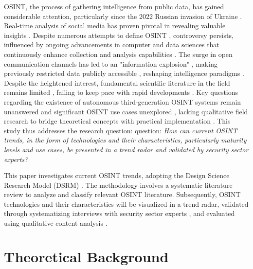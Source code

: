 \documentclass[10pt]{article}
\begin{document}
OSINT, the process of gathering intelligence from public data, has gained considerable attention, particularly since
the 2022 Russian invasion of Ukraine \cite{DosPassos.2017}. Real-time analysis of social media has proven pivotal in revealing
valuable insights \cite{SmithBoyle.24.07.2023}. Despite numerous attempts to define OSINT
\cite{Hwang.2022, PastorGalindo.2020, Yogish.2021}, controversy persists, influenced by ongoing advancements in computer and
data sciences that continuously enhance collection and analysis capabilities \cite{Ghioni.2023, Williams.2018}.
The surge in open communication channels has led to an "information explosion" \cite{DosPassos.2017, Hwang.2022, Yogish.2021},
making previously restricted data publicly accessible \cite{Hwang.2022, Williams.2018}, reshaping intelligence paradigms \cite{Dokman.2020}.
Despite the heightened interest, fundamental scientific literature in the field remains limited \cite{HerreraCubides.2020},
failing to keep pace with rapid developments \cite{Ghioni.2023, Williams.2018}. Key questions regarding the existence of
autonomous third-generation OSINT systems \cite{PastorGalindo.2019, PastorGalindo.2020} remain unanswered
\cite{Ghioni.2023, PastorGalindo.2020, Yogish.2021} and significant OSINT use cases unexplored
\cite{AlKilani.2021, Dokman.2020, Ghioni.2023}, lacking qualitative field research to bridge theoretical concepts with
practical implementation \cite{HerreraCubides.2020, PastorGalindo.2019}. This study thus addresses the research question:
question: \textit{How can current OSINT trends, in the form of technologies and their characteristics, particularly maturity levels and use cases, be presented in a trend radar and validated by security sector experts?}


This paper investigates current OSINT trends, adopting the Design Science Research Model (DSRM) \cite{Peffers.2007}.
The methodology involves a systematic literature review \cite{Webster.2002} to analyze and classify relevant OSINT literature.
Subsequently, OSINT technologies and their characteristics will be visualized in a trend radar, validated through systematizing
interviews with security sector experts \cite{Bogner.2014}, and evaluated using qualitative content analysis \cite{Billings.1997}.


\section{Theoretical Background} \label{sec:theoreticalbackground}
\end{document}
